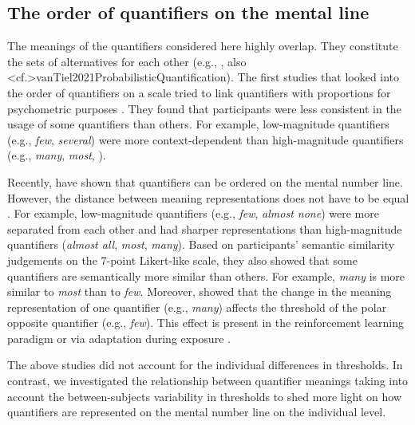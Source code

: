 \documentclass{article}
\begin{document}
\subsection{The order of quantifiers on the mental line}
The meanings of the quantifiers considered here highly overlap. They constitute the sets of alternatives for each other (e.g., , also \citeNP<cf.>{vanTiel2021ProbabilisticQuantification}). The first studies that looked into the order of quantifiers on a scale tried to link quantifiers with proportions for psychometric purposes \cite{Hammerton1976HowPart, Newstead1987TheScales}. They found that participants were less consistent in the usage of some quantifiers than others. For example, low-magnitude quantifiers (e.g., \textit{few}, \textit{several}) were more context-dependent than high-magnitude quantifiers (e.g., \textit{many}, \textit{most}, ). 

Recently,  have shown that quantifiers can be ordered on the mental number line. However, the distance between meaning representations does not have to be equal \cite<see also>{vanTiel2021ProbabilisticQuantification}. For example, low-magnitude quantifiers (e.g., \textit{few}, \textit{almost none}) were more separated from each other and had sharper representations than high-magnitude quantifiers (\textit{almost all}, \textit{most}, \textit{many}). Based on participants' semantic similarity judgements on the 7-point Likert-like scale, they also showed that some quantifiers are semantically more similar than others. For example, \textit{many} is more similar to \textit{most} than to \textit{few}. Moreover,  showed that the change in the meaning representation of one quantifier (e.g., \textit{many}) affects the threshold of the polar opposite quantifier (e.g., \textit{few}). This effect is present in the reinforcement learning paradigm \cite{Heim2015Ifmany} or via adaptation during exposure \cite{Heim2020FewProcessing}. 

The above studies did not account for the individual differences in thresholds. In contrast, we investigated the relationship between quantifier meanings taking into account the between-subjects variability in thresholds to shed more light on how quantifiers are represented on the mental number line on the individual level.
\end{document}
